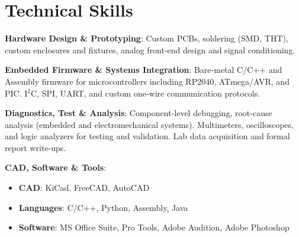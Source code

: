 \section{Technical Skills}
\begin{onecolentry}
    \begin{highlightsforbulletentries}
    \item \textbf{Hardware Design \& Prototyping}: Custom PCBs, soldering (SMD, THT), custom enclosures and fixtures, analog front-end design and signal conditioning.
    \item \textbf{Embedded Firmware \& Systems Integration}: Bare-metal C/C++ and Assembly firmware for microcontrollers including RP2040, ATmega/AVR, and PIC. I$^2$C, SPI, UART, and custom one-wire communication protocols.
    \item \textbf{Diagnostics, Test \& Analysis}: Component-level debugging, root-cause analysis (embedded and electromechanical systems). Multimeters, oscilloscopes, and logic analyzers for testing and validation. Lab data acquisition and formal report write-ups.
    \item \textbf{CAD, Software \& Tools}:
    \begin{itemize}
        \item \textbf{CAD}: KiCad, FreeCAD, AutoCAD 
        \item \textbf{Languages}: C/C++, Python, Assembly, Java%
        \item \textbf{Software}: MS Office Suite, Pro Tools, Adobe Audition, Adobe Photoshop
    \end{itemize}
    \end{highlightsforbulletentries}
\end{onecolentry}
